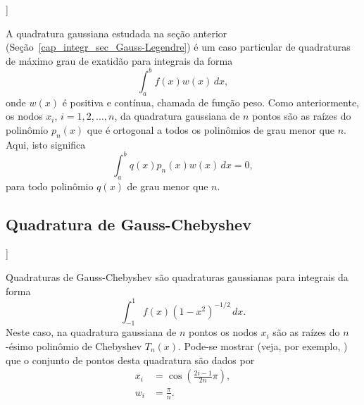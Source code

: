 \begin{flushleft}
  [[tag:revisar]]
\end{flushleft}

A quadratura gaussiana estudada na seção anterior (Seção~\ref{cap_integr_sec_Gauss-Legendre}) é um caso particular de quadraturas de máximo grau de exatidão para integrais da forma
\begin{equation}
  \int_a^b f(x)w(x)\,dx,
\end{equation}
onde $w(x)$ é positiva e contínua, chamada de função peso. Como anteriormente, os nodos $x_i$, $i=1, 2, \dotsc, n$, da quadratura gaussiana de $n$ pontos são as raízes do polinômio $p_n(x)$ que é ortogonal a todos os polinômios de grau menor que $n$. Aqui, isto significa
\begin{equation}
  \int_a^b q(x)p_n(x)w(x)\,dx = 0,
\end{equation}
para todo polinômio $q(x)$ de grau menor que $n$.

\subsection{Quadratura de Gauss-Chebyshev}

\begin{flushleft}
  [[tag:revisar]]
\end{flushleft}

Quadraturas de Gauss-Chebyshev são quadraturas gaussianas para integrais da forma
\begin{equation}
  \int_{-1}^1 f(x)(1-x^2)^{-1/2}\,dx.
\end{equation}
Neste caso, na quadratura gaussiana de $n$ pontos os nodos $x_i$ são as raízes do $n$-ésimo polinômio de Chebyshev $T_n(x)$. Pode-se mostrar (veja, por exemplo, \cite[Cap. 7, Sec. 4.1]{Isaacson1994a}) que o conjunto de pontos desta quadratura são dados por
\begin{align}
  x_i &= \cos\left(\frac{2i-1}{2n}\pi\right),\\
  w_i &= \frac{\pi}{n}.
\end{align}

